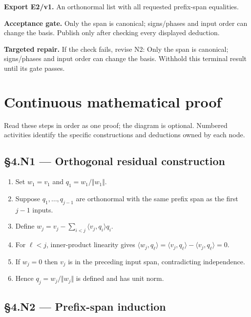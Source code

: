 \documentclass[preprint,12pt,aps,pra,showkeys,amsmath,amssymb,superscriptaddress,floatfix]{revtex4-2}
\theoremstyle{definition}
\theoremstyle{remark}
\newcommand{\field}[2]{\par\smallskip\noindent\textbf{#1.} #2\par}
\begin{document}
\field{Export E2/v1}{An orthonormal list with all requested prefix-span equalities.}

\field{Acceptance gate}{Only the span is canonical; signs/phases and input order can change the
basis. Publish only after checking every displayed deduction.}

\field{Targeted repair}{If the check fails, revise N2: Only the span is canonical; signs/phases
and input order can change the basis. Withhold this terminal result
until its gate passes.}

\endgroup\clearpage\section{Continuous mathematical proof}\label{sec:proof}

Read these steps in order as one proof; the diagram is optional.
Numbered activities identify the specific constructions and deductions
owned by each node.

\subsection{§4.N1 --- Orthogonal residual
construction}\label{n1-orthogonal-residual-construction}

\begin{enumerate}
\def\labelenumi{\arabic{enumi}.}
\item
  Set \(w_{1}=v_{1}\) and \(q_{1}=w_{1}/\Vert w_{1}\Vert\).
\item
  Suppose \(q_{1},\ldots ,q_{j-1}\) are orthonormal with the same prefix
  span as the first \(j-1\) inputs.
\item
  Define \(w_j=v_j-\sum _{i<j}\langle v_j,q_i\rangle q_i\).
\item
  For \(\ell <j\), inner-product linearity gives
  \(\langle w_j,q_\ell \rangle =\langle v_j,q_\ell \rangle -\langle v_j,q_\ell \rangle =0\).
\item
  If \(w_j=0\) then \(v_j\) is in the preceding input span,
  contradicting independence.
\item
  Hence \(q_j=w_j/\Vert w_j\Vert\) is defined and has unit norm.
\end{enumerate}

\subsection{§4.N2 --- Prefix-span
induction}\label{n2-prefix-span-induction}
\end{document}
